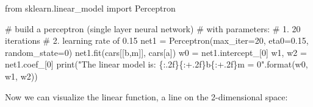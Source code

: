 \documentclass[
  letterpaper,
]{scrbook}
\newenvironment{Shaded}{\begin{snugshade}}{\end{snugshade}}
\newcommand{\BuiltInTok}[1]{\textcolor[rgb]{0.00,0.23,0.31}{#1}}
\newcommand{\CommentTok}[1]{\textcolor[rgb]{0.37,0.37,0.37}{#1}}
\newcommand{\DecValTok}[1]{\textcolor[rgb]{0.68,0.00,0.00}{#1}}
\newcommand{\FloatTok}[1]{\textcolor[rgb]{0.68,0.00,0.00}{#1}}
\newcommand{\ImportTok}[1]{\textcolor[rgb]{0.00,0.46,0.62}{#1}}
\newcommand{\NormalTok}[1]{\textcolor[rgb]{0.00,0.23,0.31}{#1}}
\newcommand{\OperatorTok}[1]{\textcolor[rgb]{0.37,0.37,0.37}{#1}}
\newcommand{\SpecialCharTok}[1]{\textcolor[rgb]{0.37,0.37,0.37}{#1}}
\newcommand{\StringTok}[1]{\textcolor[rgb]{0.13,0.47,0.30}{#1}}
\begin{document}
\begin{Shaded}
\begin{Highlighting}[]
\ImportTok{from}\NormalTok{ sklearn.linear\_model }\ImportTok{import}\NormalTok{ Perceptron}

\CommentTok{\# build a perceptron (single layer neural network)}
\CommentTok{\# with parameters: }
\CommentTok{\# 1. 20 iterations}
\CommentTok{\# 2. learning rate of 0.15}
\NormalTok{net1 }\OperatorTok{=}\NormalTok{ Perceptron(max\_iter}\OperatorTok{=}\DecValTok{20}\NormalTok{, eta0}\OperatorTok{=}\FloatTok{0.15}\NormalTok{, random\_state}\OperatorTok{=}\DecValTok{0}\NormalTok{)}
\NormalTok{net1.fit(cars[[}\StringTok{\textquotesingle{}b\textquotesingle{}}\NormalTok{,}\StringTok{\textquotesingle{}m\textquotesingle{}}\NormalTok{]], cars[}\StringTok{\textquotesingle{}a\textquotesingle{}}\NormalTok{])}
\NormalTok{w0 }\OperatorTok{=}\NormalTok{ net1.intercept\_[}\DecValTok{0}\NormalTok{]}
\NormalTok{w1, w2 }\OperatorTok{=}\NormalTok{ net1.coef\_[}\DecValTok{0}\NormalTok{]}
\BuiltInTok{print}\NormalTok{(}\StringTok{"The linear model is: }\SpecialCharTok{\{:.2f\}\{:+.2f\}}\StringTok{b}\SpecialCharTok{\{:+.2f\}}\StringTok{m = 0"}\NormalTok{.}\BuiltInTok{format}\NormalTok{(w0, w1, w2))}
\end{Highlighting}
\end{Shaded}

Now we can visualize the linear function, a line on the 2-dimensional
space:
\end{document}
